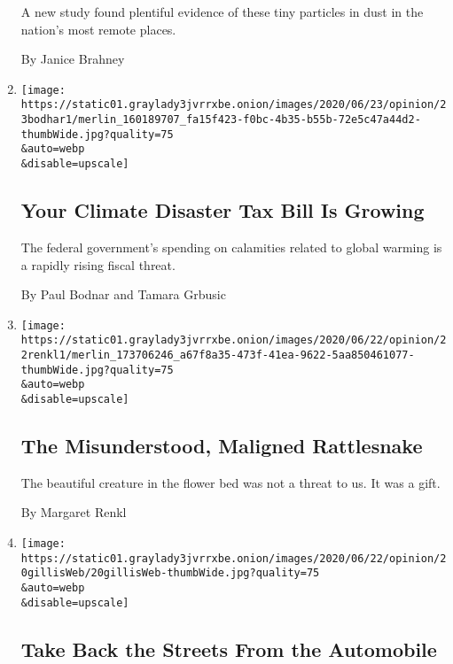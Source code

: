 \begin{enumerate}
  A new study found plentiful evidence of these tiny particles in dust
  in the nation's most remote places.

  By Janice Brahney
\item
  \href{/2020/06/23/opinion/climate-change-financial-disaster.html}{}

  \texttt{[image: https://static01.graylady3jvrrxbe.onion/images/2020/06/23/opinion/23bodhar1/merlin\_160189707\_fa15f423-f0bc-4b35-b55b-72e5c47a44d2-thumbWide.jpg?quality=75\\\&auto=webp\\\&disable=upscale]}

  \hypertarget{your-climate-disaster-tax-bill-is-growing}{%
  \subsection{Your Climate Disaster Tax Bill Is
  Growing}\label{your-climate-disaster-tax-bill-is-growing}}

  The federal government's spending on calamities related to global
  warming is a rapidly rising fiscal threat.

  By Paul Bodnar and Tamara Grbusic
\item
  \href{/2020/06/22/opinion/rattlesnakes.html}{}

  \texttt{[image: https://static01.graylady3jvrrxbe.onion/images/2020/06/22/opinion/22renkl1/merlin\_173706246\_a67f8a35-473f-41ea-9622-5aa850461077-thumbWide.jpg?quality=75\\\&auto=webp\\\&disable=upscale]}

  \hypertarget{the-misunderstood-maligned-rattlesnake}{%
  \subsection{The Misunderstood, Maligned
  Rattlesnake}\label{the-misunderstood-maligned-rattlesnake}}

  The beautiful creature in the flower bed was not a threat to us. It
  was a gift.

  By Margaret Renkl
\item
  \href{/2020/06/20/opinion/pandemic-automobile-cities.html}{}

  \texttt{[image: https://static01.graylady3jvrrxbe.onion/images/2020/06/22/opinion/20gillisWeb/20gillisWeb-thumbWide.jpg?quality=75\\\&auto=webp\\\&disable=upscale]}

  \hypertarget{take-back-the-streets-from-the-automobile}{%
  \subsection{Take Back the Streets From the
  Automobile}\label{take-back-the-streets-from-the-automobile}}


\end{enumerate}
